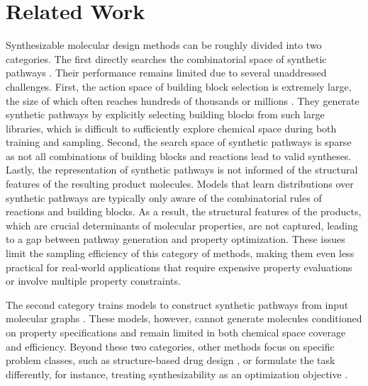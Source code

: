 \section{Related Work}
\label{sec:related}


Synthesizable molecular design methods can be roughly divided into two categories. 
The first directly searches the combinatorial space of synthetic pathways \citep{vinkers2003synopsis,hartenfeller2012dogs,korovina2020chembo,gottipati2020learning,horwood2020reactor,bradshaw2020barking,gao2021amortized,swanson2024synthemol,cretu2024synflownet,seo2024generative,koziarski2024rgfn,zhu2025syngfn}. 
Their performance remains limited due to several unaddressed challenges.
First, the action space of building block selection is extremely large, the size of which often reaches hundreds of thousands or millions \citep{enamineBuildingBlocks}.
They generate synthetic pathways by explicitly selecting building blocks from such large libraries, which is difficult to sufficiently explore chemical space during both training and sampling.
Second, the search space of synthetic pathways is sparse as not all combinations of building blocks and reactions lead to valid syntheses.
Lastly, the representation of synthetic pathways is not informed of the structural features of the resulting product molecules.
Models that learn distributions over synthetic pathways are typically only aware of the combinatorial rules of reactions and building blocks.
As a result, the structural features of the products, which are crucial determinants of molecular properties, are not captured, leading to a gap between pathway generation and property optimization.
These issues limit the sampling efficiency of this category of methods, making them even less practical for real-world applications that require expensive property evaluations or involve multiple property constraints.

The second category trains models to construct synthetic pathways from input molecular graphs \citep{luo2024projecting,gao2025generative,sun2024procedural,sun2025synllama,lee2025rethinking}.
These models, however, cannot generate molecules conditioned on property specifications and remain limited in both chemical space coverage and efficiency.
Beyond these two categories, other methods focus on specific problem classes, such as structure-based drug design \citep{jocys2024synthformer,rekesh2025syncogen}, or formulate the task differently, for instance, treating synthesizability as an optimization objective \citep{guo2024saturn,guo2025directly}.
